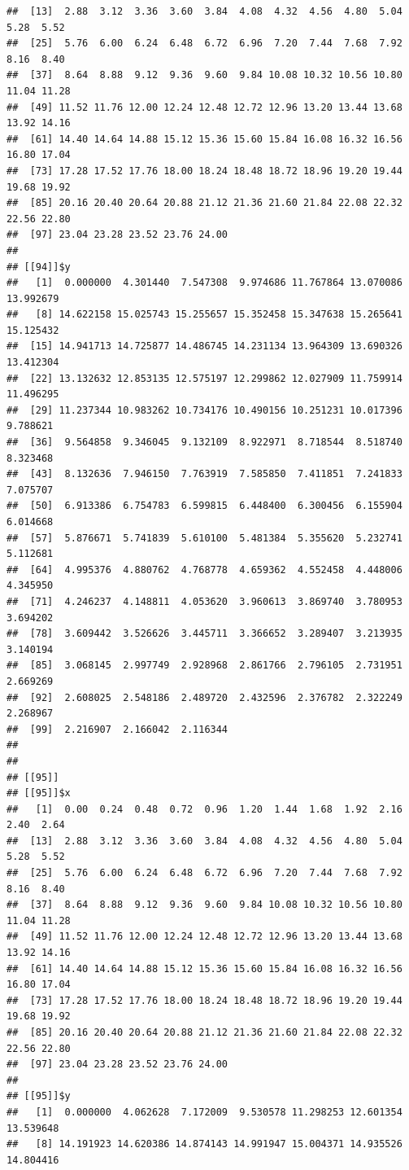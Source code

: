 \documentclass[
  ignorenonframetext,
]{beamer}
\begin{document}
\begin{frame}[fragile]{}
\begin{verbatim}
##  [13]  2.88  3.12  3.36  3.60  3.84  4.08  4.32  4.56  4.80  5.04  5.28  5.52
##  [25]  5.76  6.00  6.24  6.48  6.72  6.96  7.20  7.44  7.68  7.92  8.16  8.40
##  [37]  8.64  8.88  9.12  9.36  9.60  9.84 10.08 10.32 10.56 10.80 11.04 11.28
##  [49] 11.52 11.76 12.00 12.24 12.48 12.72 12.96 13.20 13.44 13.68 13.92 14.16
##  [61] 14.40 14.64 14.88 15.12 15.36 15.60 15.84 16.08 16.32 16.56 16.80 17.04
##  [73] 17.28 17.52 17.76 18.00 18.24 18.48 18.72 18.96 19.20 19.44 19.68 19.92
##  [85] 20.16 20.40 20.64 20.88 21.12 21.36 21.60 21.84 22.08 22.32 22.56 22.80
##  [97] 23.04 23.28 23.52 23.76 24.00
## 
## [[94]]$y
##   [1]  0.000000  4.301440  7.547308  9.974686 11.767864 13.070086 13.992679
##   [8] 14.622158 15.025743 15.255657 15.352458 15.347638 15.265641 15.125432
##  [15] 14.941713 14.725877 14.486745 14.231134 13.964309 13.690326 13.412304
##  [22] 13.132632 12.853135 12.575197 12.299862 12.027909 11.759914 11.496295
##  [29] 11.237344 10.983262 10.734176 10.490156 10.251231 10.017396  9.788621
##  [36]  9.564858  9.346045  9.132109  8.922971  8.718544  8.518740  8.323468
##  [43]  8.132636  7.946150  7.763919  7.585850  7.411851  7.241833  7.075707
##  [50]  6.913386  6.754783  6.599815  6.448400  6.300456  6.155904  6.014668
##  [57]  5.876671  5.741839  5.610100  5.481384  5.355620  5.232741  5.112681
##  [64]  4.995376  4.880762  4.768778  4.659362  4.552458  4.448006  4.345950
##  [71]  4.246237  4.148811  4.053620  3.960613  3.869740  3.780953  3.694202
##  [78]  3.609442  3.526626  3.445711  3.366652  3.289407  3.213935  3.140194
##  [85]  3.068145  2.997749  2.928968  2.861766  2.796105  2.731951  2.669269
##  [92]  2.608025  2.548186  2.489720  2.432596  2.376782  2.322249  2.268967
##  [99]  2.216907  2.166042  2.116344
## 
## 
## [[95]]
## [[95]]$x
##   [1]  0.00  0.24  0.48  0.72  0.96  1.20  1.44  1.68  1.92  2.16  2.40  2.64
##  [13]  2.88  3.12  3.36  3.60  3.84  4.08  4.32  4.56  4.80  5.04  5.28  5.52
##  [25]  5.76  6.00  6.24  6.48  6.72  6.96  7.20  7.44  7.68  7.92  8.16  8.40
##  [37]  8.64  8.88  9.12  9.36  9.60  9.84 10.08 10.32 10.56 10.80 11.04 11.28
##  [49] 11.52 11.76 12.00 12.24 12.48 12.72 12.96 13.20 13.44 13.68 13.92 14.16
##  [61] 14.40 14.64 14.88 15.12 15.36 15.60 15.84 16.08 16.32 16.56 16.80 17.04
##  [73] 17.28 17.52 17.76 18.00 18.24 18.48 18.72 18.96 19.20 19.44 19.68 19.92
##  [85] 20.16 20.40 20.64 20.88 21.12 21.36 21.60 21.84 22.08 22.32 22.56 22.80
##  [97] 23.04 23.28 23.52 23.76 24.00
## 
## [[95]]$y
##   [1]  0.000000  4.062628  7.172009  9.530578 11.298253 12.601354 13.539648
##   [8] 14.191923 14.620386 14.874143 14.991947 15.004371 14.935526 14.804416

\end{verbatim}
\end{frame}
\end{document}
